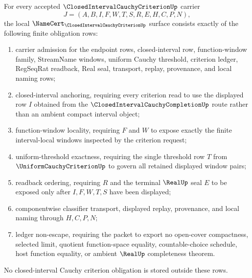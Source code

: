 \begin{theorem}
\label{thm:closed-interval-cauchy-criterion-namecert-obligations}
For every accepted $\ClosedIntervalCauchyCriterionUp$ carrier
$$
J=(A,B,I,F,W,T,S,R,E,H,C,P,N),
$$
the local $\NameCert_{\ClosedIntervalCauchyCriterionUp}$ surface consists exactly of the following finite obligation rows:
\begin{enumerate}
\item carrier admission for the endpoint rows, closed-interval row, function-window family, StreamName windows, uniform Cauchy threshold, criterion ledger, RegSeqRat readback, Real seal, transport, replay, provenance, and local naming rows;
\item closed-interval anchoring, requiring every criterion read to use the displayed row $I$ obtained from the $\ClosedIntervalCauchyCompletionUp$ route rather than an ambient compact interval object;
\item function-window locality, requiring $F$ and $W$ to expose exactly the finite interval-local windows inspected by the criterion request;
\item uniform-threshold exactness, requiring the single threshold row $T$ from $\UniformCauchyCriterionUp$ to govern all retained displayed window pairs;
\item readback ordering, requiring $R$ and the terminal $\RealUp$ seal $E$ to be exposed only after $I,F,W,T,S$ have been displayed;
\item componentwise classifier transport, displayed replay, provenance, and local naming through $H,C,P,N$;
\item ledger non-escape, requiring the packet to export no open-cover compactness, selected limit, quotient function-space equality, countable-choice schedule, host function equality, or ambient $\RealUp$ completeness theorem.
\end{enumerate}
No closed-interval Cauchy criterion obligation is stored outside these rows.
\end{theorem}
